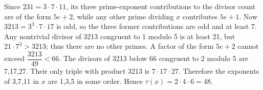 Since $ 231=3\cdot7\cdot11 $, its three prime-exponent contributions to the divisor count are of the form $ 5e+2 $, while any other prime dividing $ x $ contributes $ 5e+1 $. Now $ 3213=3^3\cdot7\cdot17 $ is odd, so the three former contributions are odd and at least 7. Any nontrivial divisor of 3213 congruent to 1 modulo 5 is at least 21, but $ 21\cdot7^3>3213 $; thus there are no other primes. A factor of the form $ 5e+2 $ cannot exceed $\dfrac{3213}{49}<66 $. The divisors of 3213 below 66 congruent to 2 modulo 5 are 7,17,27. Their only triple with product 3213 is $ 7\cdot17\cdot27 $. Therefore the exponents of 3,7,11 in $ x $ are 1,3,5 in some order. Hence $\tau(x)=2\cdot4\cdot6=\boxed{48}$.

